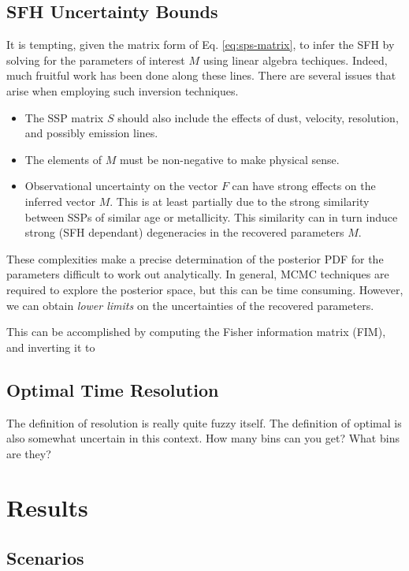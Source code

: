 \documentclass[iop,numberedappendix]{emulateapj}
\begin{document}
\subsection{SFH Uncertainty Bounds}
It is tempting, given the matrix form of Eq. \ref{eq:sps-matrix}, to infer the SFH by solving for the parameters of interest $M$ using linear algebra techiques.
Indeed, much fruitful work has been done along these lines.
There are several issues that arise when employing such inversion techniques.
\begin{itemize}

\item The SSP matrix $S$ should also include the effects of dust, velocity, resolution, and possibly emission lines.

\item The elements of $M$ must be non-negative to make physical sense.

\item Observational uncertainty on the vector $F$ can have strong effects on the inferred vector $M$.  
This is at least partially due to the strong similarity between SSPs of similar age or metallicity.  
This similarity can in turn induce strong (SFH dependant) degeneracies in the recovered parameters $M$.
\end{itemize}
These complexities make a precise determination of the posterior PDF for the parameters difficult to work out analytically.
In general, MCMC techniques are required to explore the posterior space, but this can be time consuming.
However, we can obtain \emph{lower limits} on the uncertainties of the recovered parameters.

This can be accomplished by computing the Fisher information matrix (FIM), and inverting it to 

\subsection{Optimal Time Resolution}

The definition of resolution is really quite fuzzy itself.
The definition of optimal is also somewhat uncertain in this context.
How many bins can you get?  What bins are they?

\section{Results}

\subsection{Scenarios}
\end{document}
